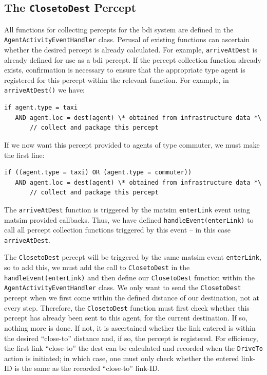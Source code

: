 \subsection{The \lstinline{ClosetoDest} Percept}
All functions for collecting percepts for the \gls{bdi} system are defined
in the \lstinline{AgentActivityEventHandler} class. Perusal of existing
functions can ascertain whether the desired percept is already
calculated. For example, \lstinline{arriveAtDest} is already defined for use as a
\gls{bdi} percept. 
%
If the percept collection function already exists, 
confirmation is necessary to ensure that the appropriate type agent is
registered for this percept within the relevant function.
For example, in \lstinline{arriveAtDest()} we have:
\begin{lstlisting}
if agent.type = taxi
   AND agent.loc = dest(agent) \* obtained from infrastructure data *\
       // collect and package this percept
\end{lstlisting}
If we now want this percept provided to agents of type commuter, we
must make the first line:
\begin{lstlisting}
if ((agent.type = taxi) OR (agent.type = commuter))
   AND agent.loc = dest(agent) \* obtained from infrastructure data *\
       // collect and package this percept
\end{lstlisting}

The \lstinline{arriveAtDest} function is triggered by the \gls{matsim}
\lstinline{enterLink} event using \gls{matsim} provided callbacks. Thus,
we have defined \lstinline{handleEvent(enterLink)} to call all percept
  collection functions triggered by this event -- in this case
  \lstinline{arriveAtDest}. 

The \lstinline{ClosetoDest} percept will be triggered by the same \gls{matsim}
event \lstinline{enterLink}, so to add this, we must add the call to
\lstinline{ClosetoDest} in the \lstinline{handleEvent(enterLink)} and then
  define our \lstinline{ClosetoDest} function within the
  \lstinline{AgentActivityEventHandler} class.  We only want to send the
  \lstinline{ClosetoDest} percept when we first come within the defined
  distance of our destination, not at every step. Therefore, the
  \lstinline{ClosetoDest} function must first check whether this percept
  has already been sent to this agent, for the current destination. If
  so, nothing more is done. If not, it is ascertained whether the link
  entered is within the desired ``close-to'' distance and, if so, the
  percept is registered. For efficiency, the first link 
 ``close-to'' the dest can be calculated and recorded when the
    \lstinline{DriveTo} action is initiated; in which case, one must only
   check whether the entered link-ID is the same as the recorded
    ``close-to'' link-ID.


